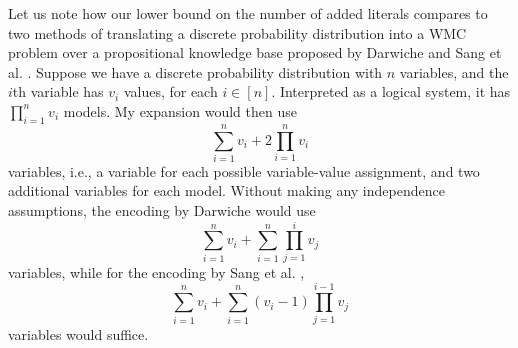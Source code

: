 \documentclass{article}
\theoremstyle{definition}
\theoremstyle{remark}
\begin{document}

Let us note how our lower bound on the number of added literals compares to two
methods of translating a discrete probability distribution into a WMC problem
over a propositional knowledge base proposed by Darwiche
\cite{DBLP:conf/kr/Darwiche02} and Sang et al. \cite{DBLP:conf/aaai/SangBK05}.
Suppose we have a discrete probability distribution with  $n$ variables, and the
$i$th variable has $v_i$ values, for each $i \in [n]$. Interpreted as a logical
system, it has $\prod_{i=1}^n v_i$ models. My expansion would then use
\[
  \sum_{i=1}^n v_i + 2\prod_{i=1}^n v_i
\]
variables, i.e., a variable for each possible variable-value assignment, and two
additional variables for each model. Without making any independence
assumptions, the encoding by Darwiche \cite{DBLP:conf/kr/Darwiche02} would use
\[
  \sum_{i=1}^n v_i + \sum_{i=1}^n \prod_{j=1}^i v_j
\]
variables, while for the encoding by Sang et al. \cite{DBLP:conf/aaai/SangBK05},
\[
  \sum_{i=1}^n v_i + \sum_{i=1}^n (v_i - 1) \prod_{j=1}^{i-1} v_j
\]
variables would suffice.




\end{document}

